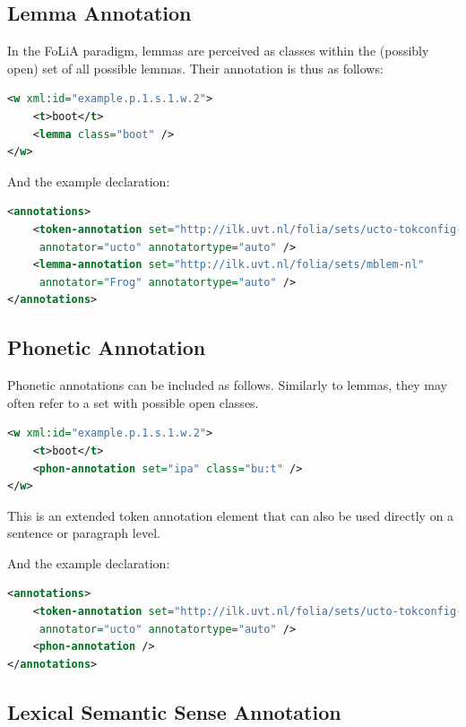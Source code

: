 \documentclass[a4paper,12pt]{report}
\begin{document}
\subsection{Lemma Annotation}

In the FoLiA paradigm, lemmas are perceived as classes within the (possibly open) set of all possible lemmas. Their annotation is thus as follows:

\begin{lstlisting}[language=xml]
<w xml:id="example.p.1.s.1.w.2">
    <t>boot</t>
    <lemma class="boot" />
</w>
\end{lstlisting}

And the example declaration:

\begin{lstlisting}[language=xml]
<annotations>
    <token-annotation set="http://ilk.uvt.nl/folia/sets/ucto-tokconfig-nl" 
     annotator="ucto" annotatortype="auto" />
    <lemma-annotation set="http://ilk.uvt.nl/folia/sets/mblem-nl"
     annotator="Frog" annotatortype="auto" />
</annotations>
\end{lstlisting}

\subsection{Phonetic Annotation}

Phonetic annotations can be included as follows. Similarly to lemmas, they may often refer to a set with possible open classes.

\begin{lstlisting}[language=xml]
<w xml:id="example.p.1.s.1.w.2">
    <t>boot</t>
    <phon-annotation set="ipa" class="bu:t" />
</w>
\end{lstlisting}

This is an extended token annotation element that can also be used directly on a sentence or paragraph level.

And the example declaration:

\begin{lstlisting}[language=xml]
<annotations>
    <token-annotation set="http://ilk.uvt.nl/folia/sets/ucto-tokconfig-nl" 
     annotator="ucto" annotatortype="auto" />
    <phon-annotation />
</annotations>
\end{lstlisting}

\subsection{Lexical Semantic Sense Annotation}
\end{document}
